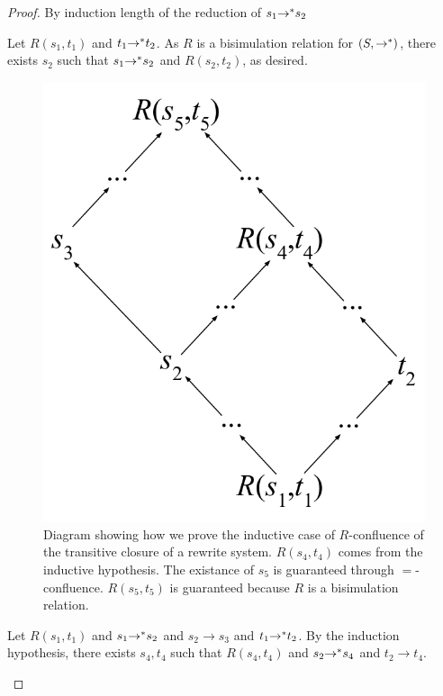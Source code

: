 \documentclass{easychair}
\begin{document}
\begin{proof}
  By induction length of the reduction of $s_1 {\rightarrow}^* s_2$
  \begin{case}
    Let $R(s_1,t_1)$ and $t_1 {\rightarrow}^* t_2$. As
    $R$ is a bisimulation relation for $(S,{\rightarrow}^*)$, there exists $s_2$ such that
    $s_1 {\rightarrow}^* s_2$ and $R(s_2,t_2)$, as desired.
  \end{case}

  \begin{figure}
    \centering
    \includegraphics[scale=.4]{solved-proof.pdf}
    \caption{Diagram showing how we prove the inductive case of $R$-confluence
      of the transitive closure of a rewrite system. $R(s_4,t_4)$ comes from the
      inductive hypothesis. The existance of $s_5$ is guaranteed through
      $=$-confluence. $R(s_5,t_5)$ is guaranteed because $R$ is a bisimulation
      relation.}
    \label{fig:solved-proof}
  \end{figure}
  
  \begin{case}
    Let $R(s_1,t_1)$ and $s_1 {\rightarrow}^* s_2$ and $s_2 \rightarrow
    s_3$ and $t_1 {\rightarrow}^* t_2$. By the induction hypothesis, there
    exists $s_4,t_4$ such that $R(s_4,t_4)$ and $s_2 {\rightarrow}^* s_4$
    and $t_2 \rightarrow t_4$.


\end{case}
\end{proof}
\end{document}
